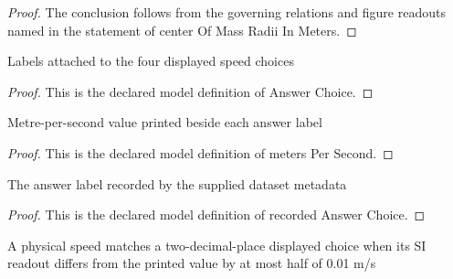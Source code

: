 \begin{proof}
  The conclusion follows from the governing relations and figure readouts named in the statement of center Of Mass Radii In Meters.
\end{proof}
\begin{definition}
  \label{def:physics:phyx-mini-0696:phyxminiproblems-problemphyxmini0696-answerchoice}
  Labels attached to the four displayed speed choices
\end{definition}
\begin{proof}
  This is the declared model definition of Answer Choice.
\end{proof}
\begin{definition}
  \label{def:physics:phyx-mini-0696:phyxminiproblems-problemphyxmini0696-answerchoice-meterspersecond}
  Metre-per-second value printed beside each answer label
\end{definition}
\begin{proof}
  This is the declared model definition of meters Per Second.
\end{proof}
\begin{definition}
  \label{def:physics:phyx-mini-0696:phyxminiproblems-problemphyxmini0696-recordedanswerchoice}
  The answer label recorded by the supplied dataset metadata
\end{definition}
\begin{proof}
  This is the declared model definition of recorded Answer Choice.
\end{proof}
\begin{definition}
  \label{def:physics:phyx-mini-0696:phyxminiproblems-problemphyxmini0696-matchesdisplayedspeed}
  A physical speed matches a two-decimal-place displayed choice when its SI readout differs from the printed value by at most half of 0.01 m/s
\end{definition}
